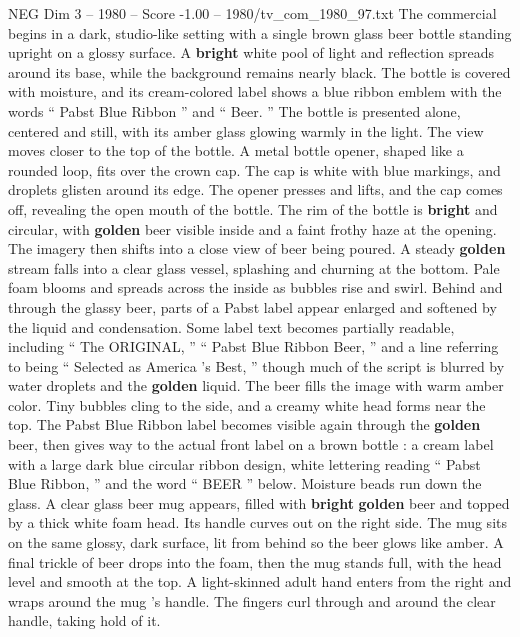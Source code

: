 \begin{textsample}{NEG Dim 3 – 1980 – Score -1.00 – 1980/tv\_com\_1980\_97.txt}  \label{ex:f3_neg_058}
The commercial begins in a dark, studio-like setting with a single brown glass beer bottle standing upright on a glossy surface.
A \textbf{bright} white pool of light and reflection spreads around its base, while the background remains nearly black.
The bottle is covered with moisture, and its cream-colored label shows a blue ribbon emblem with the words “ Pabst Blue Ribbon ” and “ Beer. ” The bottle is presented alone, centered and still, with its amber glass glowing warmly in the light.
The view moves closer to the top of the bottle.
A metal bottle opener, shaped like a rounded loop, fits over the crown cap.
The cap is white with blue markings, and droplets glisten around its edge.
The opener presses and lifts, and the cap comes off, revealing the open mouth of the bottle.
The rim of the bottle is \textbf{bright} and circular, with \textbf{golden} beer visible inside and a faint frothy haze at the opening.
The imagery then shifts into a close view of beer being poured.
A steady \textbf{golden} stream falls into a clear glass vessel, splashing and churning at the bottom.
Pale foam blooms and spreads across the inside as bubbles rise and swirl.
Behind and through the glassy beer, parts of a Pabst label appear enlarged and softened by the liquid and condensation.
Some label text becomes partially readable, including “ The ORIGINAL, ” “ Pabst Blue Ribbon Beer, ” and a line referring to being “ Selected as America ’s Best, ” though much of the script is blurred by water droplets and the \textbf{golden} liquid.
The beer fills the image with warm amber color.
Tiny bubbles cling to the side, and a creamy white head forms near the top.
The Pabst Blue Ribbon label becomes visible again through the \textbf{golden} beer, then gives way to the actual front label on a brown bottle : a cream label with a large dark blue circular ribbon design, white lettering reading “ Pabst Blue Ribbon, ” and the word “ BEER ” below.
Moisture beads run down the glass.
A clear glass beer mug appears, filled with \textbf{bright} \textbf{golden} beer and topped by a thick white foam head.
Its handle curves out on the right side.
The mug sits on the same glossy, dark surface, lit from behind so the beer glows like amber.
A final trickle of beer drops into the foam, then the mug stands full, with the head level and smooth at the top.
A light-skinned adult hand enters from the right and wraps around the mug ’s handle.
The fingers curl through and around the clear handle, taking hold of it.

\end{textsample}
